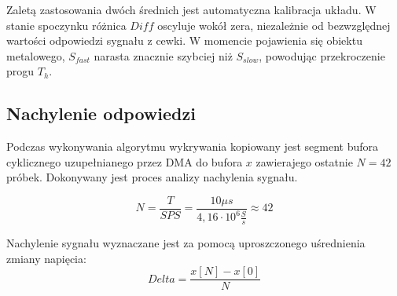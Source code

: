 Zaletą zastosowania dwóch średnich jest automatyczna kalibracja układu. W stanie spoczynku różnica $Diff$ oscyluje wokół zera, niezależnie od bezwzględnej wartości odpowiedzi sygnału z cewki. W momencie pojawienia się obiektu metalowego, $S_{fast}$ narasta znacznie szybciej niż $S_{slow}$, powodując przekroczenie progu $T_{h}$.


\subsection{Nachylenie odpowiedzi}

Podczas wykonywania algorytmu wykrywania kopiowany jest segment bufora cyklicznego uzupełnianego przez DMA do bufora $x$ zawierajego ostatnie $N=42$ próbek. Dokonywany jest proces analizy nachylenia sygnału.

\begin{equation}
    N = \frac{T}{SPS}=\frac{10\mu s}{4,16\cdot10^6 \frac{S}{s}} \approx{42}
\end{equation}

Nachylenie sygnału wyznaczane jest za pomocą uproszczonego uśrednienia zmiany napięcia:
\begin{equation}
    Delta = \frac{x[N] - x[0]}{N}
    \label{eq:nachyl}
\end{equation}
